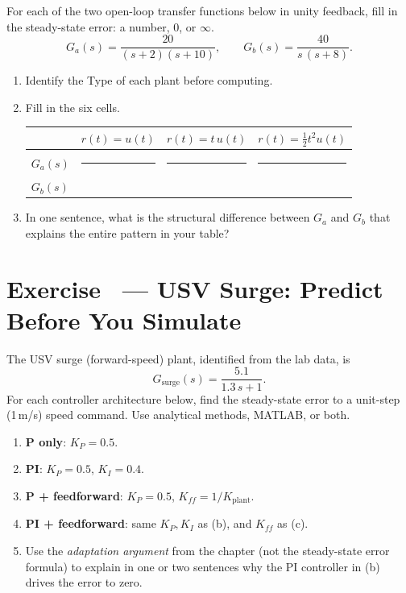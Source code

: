 \documentclass[11pt]{article}
\newcounter{exercise}
\newcommand{\exercise}[1]{%
  \refstepcounter{exercise}%
  \section*{Exercise \theexercise\ --- #1}%
}
\begin{document}
For each of the two open-loop transfer functions below in unity feedback,
fill in the steady-state error: a number, $0$, or $\infty$.
\[
  G_a(s) = \frac{20}{(s+2)(s+10)},
  \qquad
  G_b(s) = \frac{40}{s\,(s+8)}.
\]

\begin{enumerate}[label=(\alph*)]
  \item Identify the Type of each plant before computing.
  \item Fill in the six cells.
  \begin{center}
  \renewcommand{\arraystretch}{1.5}
  \begin{tabular}{l|ccc}
    \toprule
    & $r(t) = u(t)$ & $r(t) = t\,u(t)$ & $r(t) = \tfrac12 t^2 u(t)$ \\
    \midrule
    $G_a(s)$ & \rule{2.5cm}{0pt} & \rule{2.5cm}{0pt} & \rule{2.5cm}{0pt} \\
    $G_b(s)$ & & & \\
    \bottomrule
  \end{tabular}
  \end{center}
  \item In one sentence, what is the structural difference between $G_a$ and
    $G_b$ that explains the entire pattern in your table?
\end{enumerate}
\fi

\exercise{USV Surge: Predict Before You Simulate}

The USV surge (forward-speed) plant, identified from the lab data, is
\[
  G_\mathrm{surge}(s) = \frac{5.1}{1.3\,s + 1}.
\]
For each controller architecture below, find the steady-state error to a
unit-step (1\,m/s) speed command.  Use analytical methods, MATLAB, or both.

\begin{enumerate}[label=(\alph*)]
  \item \textbf{P only}: $K_P = 0.5$.
  \item \textbf{PI}: $K_P = 0.5$, $K_I = 0.4$.
  \item \textbf{P + feedforward}: $K_P = 0.5$, $K_{\!f\!f} = 1/K_\mathrm{plant}$.
  \item \textbf{PI + feedforward}: same $K_P, K_I$ as (b), and $K_{\!f\!f}$ as (c).
  \item Use the \emph{adaptation argument} from the chapter (not the
    steady-state error formula) to explain in one or two sentences why the
    PI controller in (b) drives the error to zero.
\end{enumerate}
\end{document}
